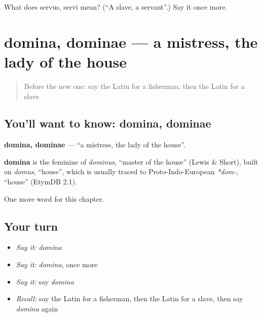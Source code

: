 \begin{tcolorbox}[breakable,colback=teal!4,colframe=teal!35!black,title={Before you move on}]
What does servus, servī mean? (\textquotedblleft{}A slave, a servant\textquotedblright{}.) Say it once more.
\end{tcolorbox}
\section[domina, dominae]{domina, dominae — a mistress, the lady of the house}

\label{lesson:LA-C138-domina}



\begin{quote}
Before the new one: say the Latin for a fisherman, then the Latin for a slave.
\end{quote}

\subsection*{You'll want to know: domina, dominae}
\textbf{domina, dominae} — \textquotedblleft{}a mistress, the lady of the house\textquotedblright{}.

\begin{cousinweb}
\textbf{domina} is the feminine of \emph{dominus}, \textquotedblleft{}master of the house\textquotedblright{} (Lewis \& Short), built on \emph{domus}, \textquotedblleft{}house\textquotedblright{}, which is usually traced to Proto-Indo-European \emph{*dom-}, \textquotedblleft{}house\textquotedblright{} (EtymDB 2.1).
\end{cousinweb}

\begin{grammarlens}[title={What you've built}]
One more word for this chapter.
\end{grammarlens}

\subsection*{Your turn}
\begin{itemize}
\raggedright
  \item \emph{Say it:} \emph{domina}
  \item \emph{Say it:} \emph{domina}, once more
  \item \emph{Say it:} say \emph{domina}
  \item \emph{Recall:} say the Latin for a fisherman, then the Latin for a slave, then say \emph{domina} again
\end{itemize}

